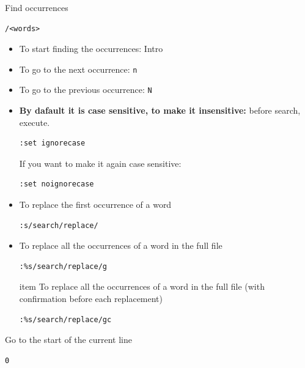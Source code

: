 \documentclass{article}
\newenvironment{blocktemplateII}[1]{%
    \tcolorbox[beamer,%
    noparskip,breakable,
    colframe=Green,%
    colbacklower=LimeGreen!75!LightGreen,%
    title=#1]}%
    {\endtcolorbox}
\newenvironment{codetemplate}[1][]{%
  \mybasecolorbox[#1]
  \itshape
}{%
  \endmybasecolorbox
}
\begin{document}
Find occurrences
\begin{codetemplate}
\begin{verbatim}
/<words>
\end{verbatim}
\end{codetemplate}
\begin{itemize}
    \item To start finding the occurrences: Intro
    \item To go to the next occurrence: \verb|n|
    \item To go to the previous occurrence: \verb|N|
    \item \textbf{By dafault it is case sensitive, to make it insensitive:} before search, execute.
\begin{codetemplate}
\begin{verbatim}
:set ignorecase
\end{verbatim}
\end{codetemplate}
\begin{blocktemplateII}{NOTE}
If you want to make it again case sensitive:
\begin{codetemplate}
\begin{verbatim}
:set noignorecase
\end{verbatim}
\end{codetemplate}
\end{blocktemplateII}
    \item To replace the first occurrence of a word
\begin{codetemplate}
\begin{verbatim}
:s/search/replace/
\end{verbatim}
\end{codetemplate}
    \item To replace all the occurrences of a word in the full file
\begin{codetemplate}
\begin{verbatim}
:%s/search/replace/g
\end{verbatim}
\end{codetemplate}
    item To replace all the occurrences of a word in the full file (with confirmation before each replacement)
\begin{codetemplate}
\begin{verbatim}
:%s/search/replace/gc
\end{verbatim}
\end{codetemplate}
\end{itemize}

Go to the start of the current line
\begin{codetemplate}
\begin{verbatim}
0
\end{verbatim}
\end{codetemplate}
\end{document}
